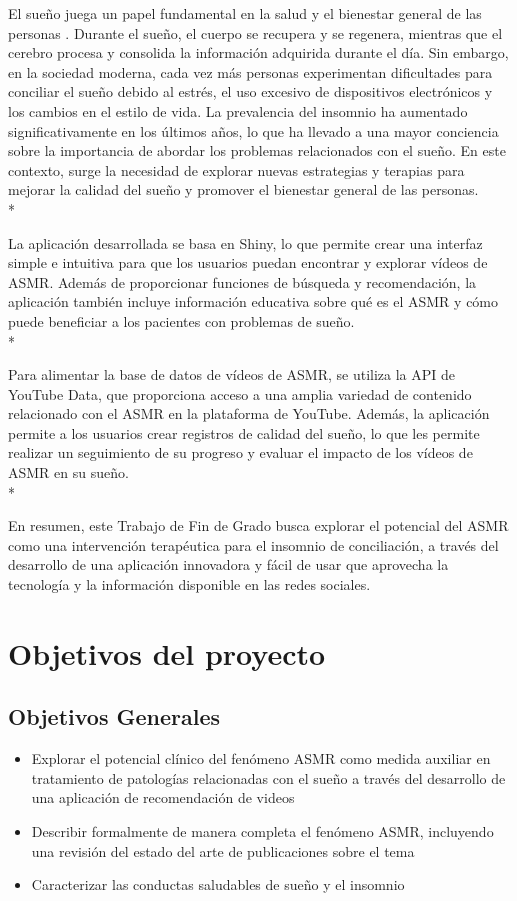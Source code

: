 \documentclass[a4paper,12pt,twoside]{memoir}
\begin{document}
El sueño juega un papel fundamental en la salud y el bienestar general de las personas \cite{nelson2021}. Durante el sueño, el cuerpo se recupera y se regenera, mientras que el cerebro procesa y consolida la información adquirida durante el día. Sin embargo, en la sociedad moderna, cada vez más personas experimentan dificultades para conciliar el sueño debido al estrés, el uso excesivo de dispositivos electrónicos y los cambios en el estilo de vida. La prevalencia del insomnio ha aumentado significativamente en los últimos años, lo que ha llevado a una mayor conciencia sobre la importancia de abordar los problemas relacionados con el sueño. En este contexto, surge la necesidad de explorar nuevas estrategias y terapias para mejorar la calidad del sueño y promover el bienestar general de las personas.\\*

La aplicación desarrollada se basa en Shiny, lo que permite crear una interfaz simple e intuitiva para que los usuarios puedan encontrar y explorar vídeos de ASMR. Además de proporcionar funciones de búsqueda y recomendación, la aplicación también incluye información educativa sobre qué es el ASMR y cómo puede beneficiar a los pacientes con problemas de sueño.\\*

Para alimentar la base de datos de vídeos de ASMR, se utiliza la API de YouTube Data, que proporciona acceso a una amplia variedad de contenido relacionado con el ASMR en la plataforma de YouTube. Además, la aplicación permite a los usuarios crear registros de calidad del sueño, lo que les permite realizar un seguimiento de su progreso y evaluar el impacto de los vídeos de ASMR en su sueño.\\*

En resumen, este Trabajo de Fin de Grado busca explorar el potencial del ASMR como una intervención terapéutica para el insomnio de conciliación, a través del desarrollo de una aplicación innovadora y fácil de usar que aprovecha la tecnología y la información disponible en las redes sociales.
\chapter{Objetivos del proyecto}

\section{Objetivos Generales}
\begin{itemize}
    \item Explorar el potencial clínico del fenómeno ASMR como medida auxiliar en tratamiento de patologías relacionadas con el sueño a través del desarrollo de una aplicación de recomendación de videos 
    \item Describir formalmente de manera completa el fenómeno ASMR, incluyendo una revisión del estado del arte de publicaciones sobre el tema
    \item Caracterizar las conductas saludables de sueño y el insomnio

\end{itemize}
\end{document}
